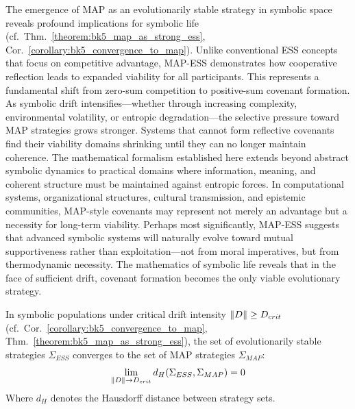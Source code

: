 \begin{scholium}
\label{scholium:bk5__map_ess_implications}
The emergence of MAP as an evolutionarily stable strategy in symbolic space reveals profound implications for symbolic life (cf.~Thm.~\ref{theorem:bk5_map_as_strong_ess}, Cor.~\ref{corollary:bk5_convergence_to_map}). Unlike conventional ESS concepts that focus on competitive advantage, MAP-ESS demonstrates how cooperative reflection leads to expanded viability for all participants. This represents a fundamental shift from zero-sum competition to positive-sum covenant formation.
As symbolic drift intensifies—whether through increasing complexity, environmental volatility, or entropic degradation—the selective pressure toward MAP strategies grows stronger. Systems that cannot form reflective covenants find their viability domains shrinking until they can no longer maintain coherence.
The mathematical formalism established here extends beyond abstract symbolic dynamics to practical domains where information, meaning, and coherent structure must be maintained against entropic forces. In computational systems, organizational structures, cultural transmission, and epistemic communities, MAP-style covenants may represent not merely an advantage but a necessity for long-term viability.
Perhaps most significantly, MAP-ESS suggests that advanced symbolic systems will naturally evolve toward mutual supportiveness rather than exploitation—not from moral imperatives, but from thermodynamic necessity. The mathematics of symbolic life reveals that in the face of sufficient drift, covenant formation becomes the only viable evolutionary strategy.
\end{scholium}
\begin{proposition}
\label{proposition:bk5_symbolic_population_ess_map_equivalence_case2}
In symbolic populations under critical drift intensity $\|D\| \geq D_{crit}$ (cf.~Cor.~\ref{corollary:bk5_convergence_to_map}, Thm.~\ref{theorem:bk5_map_as_strong_ess}), the set of evolutionarily stable strategies $\Sigma_{ESS}$ converges to the set of MAP strategies $\Sigma_{MAP}$:
\begin{equation}
\lim_{\|D\| \to D_{crit}} d_H(\Sigma_{ESS}, \Sigma_{MAP}) = 0
\end{equation}
Where $d_H$ denotes the Hausdorff distance between strategy sets.
\end{proposition}
